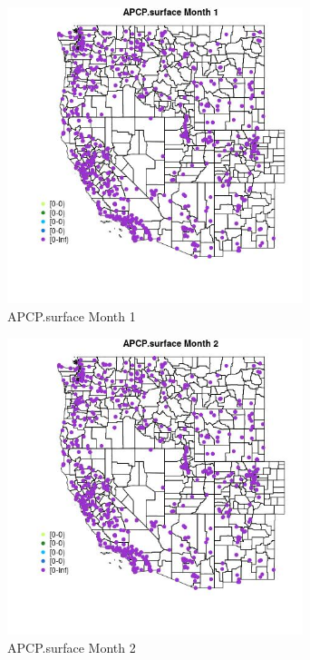 \begin{figure} 
\centering  
\includegraphics[width=0.77\textwidth]{Code_Outputs/Report_ML_input_PM25_Step4_part_f_de_duplicated_aves_prioritize_24hr_obswNAs_MapObsMo1APCPsurface.jpg} 
\caption{\label{fig:Report_ML_input_PM25_Step4_part_f_de_duplicated_aves_prioritize_24hr_obswNAsMapObsMo1APCPsurface}APCP.surface Month 1} 
\end{figure} 
 

\clearpage 

\begin{figure} 
\centering  
\includegraphics[width=0.77\textwidth]{Code_Outputs/Report_ML_input_PM25_Step4_part_f_de_duplicated_aves_prioritize_24hr_obswNAs_MapObsMo2APCPsurface.jpg} 
\caption{\label{fig:Report_ML_input_PM25_Step4_part_f_de_duplicated_aves_prioritize_24hr_obswNAsMapObsMo2APCPsurface}APCP.surface Month 2} 
\end{figure} 
 

